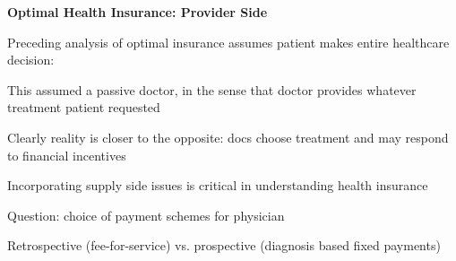 \documentclass[landscape]{slides}
\begin{document}
%
%
%
%
%
%
%
%
%
%
%


\begin{slide}
\begin{center}
{\bf Optimal Health Insurance: Provider Side}
\end{center}

Preceding analysis of optimal insurance assumes patient makes entire healthcare decision:

This assumed a passive doctor, in the sense that doctor provides whatever treatment patient requested

Clearly reality is closer to the opposite: docs choose treatment and may respond to financial incentives

Incorporating supply side issues is critical in understanding health insurance

Question: choice of payment schemes for physician

Retrospective (fee-for-service) vs. prospective (diagnosis based fixed payments)
\end{slide}


%
%
%
\end{document}
